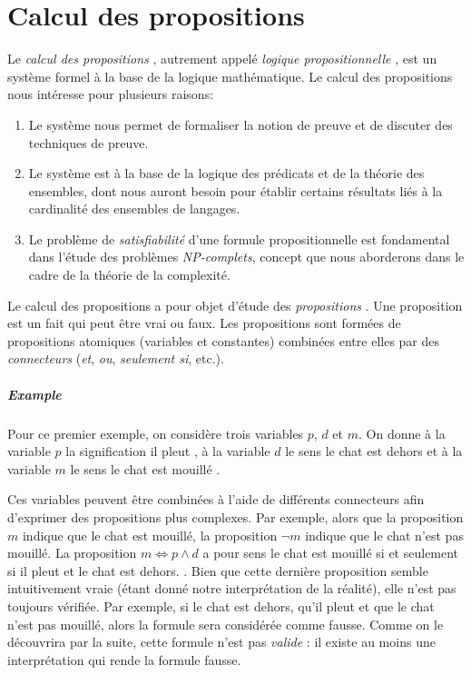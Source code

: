 \chapter{Calcul des propositions}

Le \og \textit{calcul des propositions} \fg{}, autrement appelé \og \textit{logique propositionnelle} \fg{}, est un système formel à la base de la logique mathématique. Le calcul des propositions nous intéresse pour plusieurs raisons:
\begin{enumerate}
\item
Le système nous permet de formaliser la notion de preuve et de discuter des techniques de preuve.
\item
Le système est à la base de la logique des prédicats et de la théorie des ensembles, dont nous auront besoin pour établir certains résultats liés à la cardinalité des ensembles de langages.
\item
Le problème de \og \textit{satisfiabilité} \fg{} d'une formule propositionnelle est fondamental dans l'étude des problèmes \textit{NP-complets}, concept que nous aborderons dans le cadre de la théorie de la complexité.
\end{enumerate}

Le calcul des propositions a pour objet d'étude des \og \textit{propositions} \fg{}.
Une proposition est un fait qui peut être vrai ou faux.
Les propositions sont formées de propositions atomiques (variables et constantes) combinées entre elles par des \og \textit{connecteurs} \fg{} (\textit{et}, \textit{ou}, \textit{seulement si}, etc.).

\paragraph{Example}

Pour ce premier exemple, on considère trois variables $p$, $d$ et $m$.
On donne à la variable $p$ la signification \og il pleut \fg{}, à la variable $d$ le sens \og le chat est dehors \fg{} et à la variable $m$ le sens \og le chat est mouillé \fg{}.

Ces variables peuvent être combinées à l'aide de différents connecteurs afin d'exprimer des propositions plus complexes.
Par exemple, alors que la proposition $m$ indique que le chat est mouillé, la proposition $\neg m$ indique que le chat n'est pas mouillé.
La proposition $m \iff p \wedge d$ a pour sens \og le chat est mouillé si et seulement si il pleut et le chat est dehors. \fg{}.
Bien que cette dernière proposition semble intuitivement vraie (étant donné notre interprétation de la réalité), elle n'est pas toujours vérifiée.
Par exemple, si le chat est dehors, qu'il pleut et que le chat n'est pas mouillé, alors la formule sera considérée comme fausse.
Comme on le découvrira par la suite, cette formule n'est pas \og \textit{valide} \fg{}: il existe au moins une interprétation qui rende la formule fausse.

